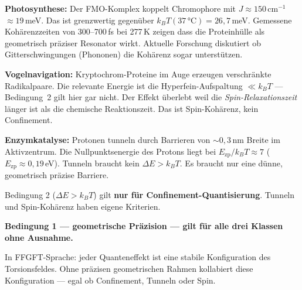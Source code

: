 \begin{center}
\end{center}

\textbf{Photosynthese:}
Der FMO-Komplex koppelt Chromophore mit $J \approx 150$\,cm$^{-1}$
$\approx 19$\,meV. Das ist grenzwertig gegenüber $k_BT(37\,°\text{C})
= 26{,}7$\,meV. Gemessene Kohärenzzeiten von 300--700\,fs bei 277\,K
zeigen dass die Proteinhülle als geometrisch präziser Resonator
wirkt. Aktuelle Forschung diskutiert ob Gitterschwingungen
(Phononen) die Kohärenz sogar unterstützen.

\textbf{Vogelnavigation:}
Kryptochrom-Proteine im Auge erzeugen verschränkte Radikalpaare.
Die relevante Energie ist die Hyperfein-Aufspaltung $\ll k_BT$ ---
Bedingung~2 gilt hier gar nicht. Der Effekt überlebt weil
die \emph{Spin-Relaxationszeit} länger ist als die chemische
Reaktionszeit. Das ist Spin-Kohärenz, kein Confinement.

\textbf{Enzymkatalyse:}
Protonen tunneln durch Barrieren von $\sim 0{,}3$\,nm Breite
im Aktivzentrum. Die Nullpunktsenergie des Protons liegt bei
$E_\text{zp}/k_BT \approx 7$ ($E_\text{zp} \approx 0{,}19$\,eV).
Tunneln braucht kein $\Delta E > k_BT$. Es braucht nur
eine dünne, geometrisch präzise Barriere.

\begin{foundation}
Bedingung 2 ($\Delta E > k_BT$) gilt \textbf{nur für Confinement-Quantisierung}.
Tunneln und Spin-Kohärenz haben eigene Kriterien.

\textbf{Bedingung 1 --- geometrische Präzision --- gilt für alle drei Klassen
ohne Ausnahme.}

In FFGFT-Sprache: jeder Quanteneffekt ist eine stabile Konfiguration
des Torsionsfeldes. Ohne präzisen geometrischen Rahmen kollabiert
diese Konfiguration --- egal ob Confinement, Tunneln oder Spin.
\end{foundation}

